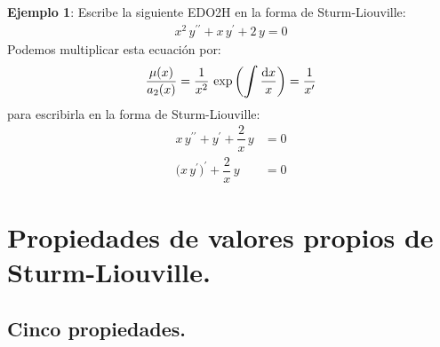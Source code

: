 \documentclass[12pt]{article}
\newcommand{\pderivada}[1]{\ensuremath{{#1}^{\prime}}}
\newcommand{\sderivada}[1]{\ensuremath{{#1}^{\prime \prime}}}
\def\scaleint#1{\vcenter{\hbox{\scaleto[3ex]{\displaystyle\int}{#1}}}}
\numberwithin{equation}{section}
\begin{document}
\noindent
\textbf{Ejemplo 1}: Escribe la siguiente EDO2H en la forma de Sturm-Liouville:
\begin{align*}
x^{2} \, \sderivada{y} + x \, \pderivada{y} + 2 \, y = 0
\end{align*}
Podemos multiplicar esta ecuación por:
\begin{align*}
\dfrac{\mu (x)}{a_{2} (x)} = \dfrac{1}{x^{2}} \, \exp \left( \scaleint{6ex} \, \dfrac{\dd{x}}{x} \right) = \dfrac{1}{\pderivada{x}}
\end{align*}
para escribirla en la forma de Sturm-Liouville:
\begin{align*}
x \, \sderivada{y} + \pderivada{y} + \dfrac{2}{x} \, y &= 0 \\[0.5em] 
\big( x \, \pderivada{y} \big)^{\prime} +  \dfrac{2}{x} \, y &= 0    
\end{align*}

\section{Propiedades de valores propios de Sturm-Liouville.}
\subsection{Cinco propiedades.}
\end{document}
